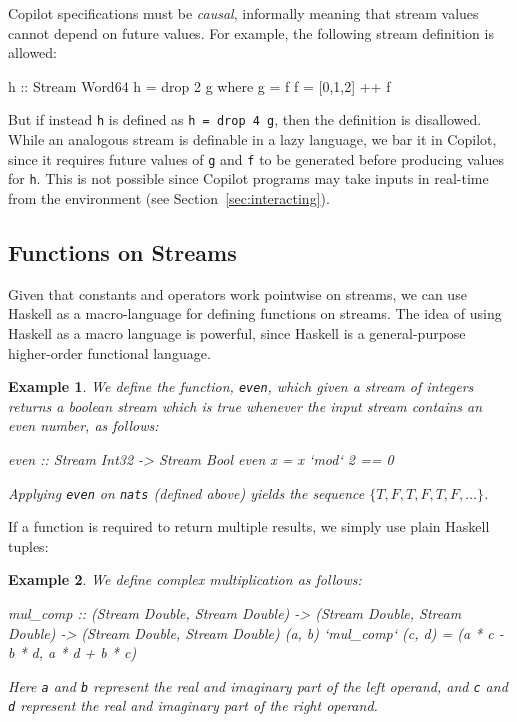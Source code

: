 \documentclass[]{article}
\theoremstyle{example}
\newtheorem{example}{Example}
\begin{document}
Copilot specifications must be \emph{causal}, informally meaning that
stream values cannot depend on future values.  For example, the following stream
definition is allowed:
%
\begin{code}
h :: Stream Word64
h = drop 2 g
  where g = f
        f = [0,1,2] ++ f
\end{code}
%

But if instead {\tt h} is defined as {\tt h = drop 4 g}, then the definition is
disallowed.  While an analogous stream is definable in a lazy language, we bar
it in Copilot, since it requires future values of {\tt g} and {\tt f} to be
generated before producing values for {\tt h}.  This is not possible since
Copilot programs may take inputs in real-time from the environment (see
Section~\ref{sec:interacting}).

\subsection{Functions on Streams}

Given that constants and operators work pointwise on streams, we can use Haskell
as a macro-language for defining functions on streams.  The idea of using
Haskell as a macro language is powerful, since Haskell is a
general-purpose higher-order functional language.

\begin{example}
We define the function, {\tt even}, which given a stream of
integers returns a boolean stream which is true whenever the input stream
contains an even number, as follows:
%
\begin{code}
even :: Stream Int32 -> Stream Bool
even x = x `mod` 2 == 0
\end{code}
%
Applying {\tt even} on {\tt nats} (defined above) yields the sequence
$\{T, F, T, F, T, F, \dots\}$.
\end{example}

If a function is required to return multiple results, we simply use plain
Haskell tuples:

\begin{example}
We define complex multiplication as follows:
%
\begin{code}
mul_comp
  :: (Stream Double, Stream Double)
  -> (Stream Double, Stream Double)
  -> (Stream Double, Stream Double)
(a, b) `mul_comp` (c, d) = (a * c - b * d, a * d + b * c)
\end{code}
%
Here {\tt a} and {\tt b} represent the real and imaginary part of the left
operand, and {\tt c} and {\tt d} represent the real and imaginary part
of the right operand.
\end{example}
\end{document}
